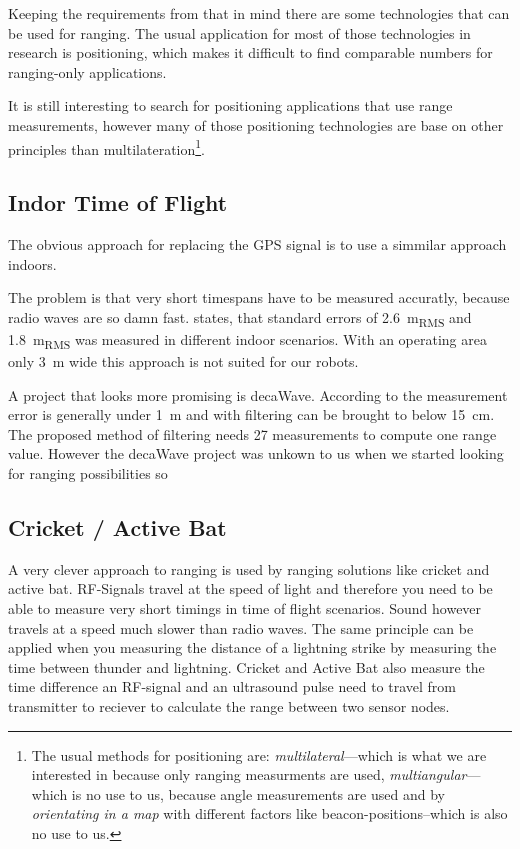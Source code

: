 Keeping the requirements from that in mind  there are some technologies that can be used for ranging.
The usual application for most of those technologies in research is positioning, which makes it difficult to find comparable numbers for ranging-only applications.



It is still interesting to search for positioning applications that use range measurements, however many of those positioning technologies are base on other principles than multilateration\footnote{The usual methods for positioning are: \emph{multilateral}—which is what we are interested in because only ranging measurments are used, \emph{multiangular}—which is no use  to us, because angle measurements are used and by \emph{orientating in a map} with different factors like beacon-positions–which is also no use to us.}.
\cite{_multilateration_2015}

\subsection{Indor Time of Flight}
The obvious approach for replacing the GPS signal is to use a simmilar approach indoors.

The problem is that very short timespans have to be measured accuratly, because radio waves are so damn fast. 
\cite{lanzisera2006} states, that standard errors of \SI{2.6}{\metre_{RMS}} and \SI{1.8}{\metre_{RMS}} was measured in different indoor scenarios.
With an operating area only \SI{3}{\metre} wide this approach is not suited for our robots.


A project that looks more promising is decaWave.
According to \cite{uwb_localisation_copter} the measurement error is generally under \SI{1}{\metre} and with filtering can be brought to below \SI{15}{\centi\metre}.
The proposed method of filtering needs 27 measurements to compute one range value.
However the decaWave project was unkown to us when we started looking for ranging possibilities so 

\subsection{Cricket / Active Bat}
A very clever approach to ranging is used by ranging solutions like cricket\cite{cricket_01} and active bat\cite{active_bat}. 
RF-Signals travel at the speed of light and therefore you need to be able to measure very short timings in time of flight scenarios.
Sound however travels at a speed much slower than radio waves.
The same principle can be applied when you measuring the distance of a lightning strike by measuring the time between thunder and lightning.
Cricket and Active Bat also measure the time difference an RF-signal and an ultrasound pulse need to travel from transmitter to reciever to calculate the range between two sensor nodes.

